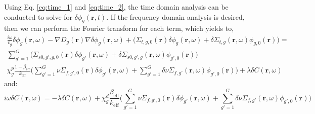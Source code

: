 Using Eq. \ref{eq:time_1} and \ref{eq:time_2}, the time domain analysis can be conducted to solve for $\delta \phi_g (\textbf{r}, t)$. If the frequency domain analysis is desired, then we can perform the Fourier transform for each term, which yields to,
\begin{equation}
        \begin{aligned}
                \frac{i \omega}{v_g} \delta \phi_g (\textbf{r}, \omega) - \nabla D_g(\textbf{r}) \nabla \delta \phi_g(\textbf{r}, \omega) + \biggl(\Sigma_{t,g,0}(\textbf{r}) \delta \phi_g(\textbf{r}, \omega) + \delta \Sigma_{t,g}(\textbf{r}, \omega) \phi_{g,0}(\textbf{r}) \biggr) = \\
                \sum_{g' = 1}^{G} \biggl(\Sigma_{s0,g',g,0}(\textbf{r}) \delta \phi_{g'}(\textbf{r}, \omega) + \delta \Sigma_{s0,g',g}(\textbf{r}, \omega) \phi_{g',0}(\textbf{r}) \biggr)\\
                \chi^p_g \frac{1-\beta_{\text{eff}}}{k_{\text{eff}}} \biggl(\sum_{g' = 1}^{G} \nu \Sigma_{f,g',0}(\textbf{r}) \delta \phi_{g'}(\textbf{r}, \omega) + \sum_{g' = 1}^{G} \delta \nu \Sigma_{f,g'}(\textbf{r}, \omega) \phi_{g',0}(\textbf{r}) \biggr) + \lambda \delta C(\textbf{r}, \omega)
        \end{aligned}
        \label{eq:freq_1}
\end{equation}
and:
\begin{equation}
        i \omega \delta C(\textbf{r}, \omega) = - \lambda \delta C(\textbf{r}, \omega) + \chi^d_g \frac{\beta_{\text{eff}}}{k_{\text{eff}}}\biggl(\sum_{g' = 1}^{G} \nu \Sigma_{f,g',0}(\textbf{r}) \delta \phi_{g'}(\textbf{r}, \omega) + \sum_{g' = 1}^{G} \delta \nu \Sigma_{f,g'}(\textbf{r}, \omega) \phi_{g',0}(\textbf{r}) \biggr)
        \label{eq:freq_2}
\end{equation}

